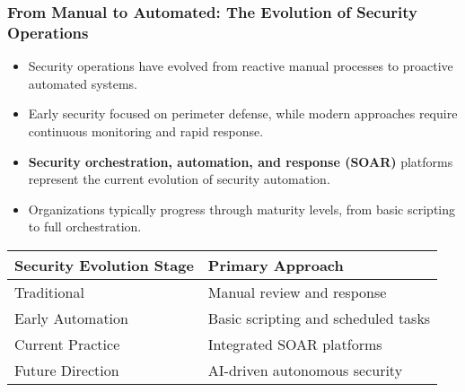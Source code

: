 \documentclass{beamer}
\begin{document}
\begin{frame}
  \frametitle{From Manual to Automated: The Evolution of Security Operations}
  
  \begin{itemize}
    \item Security operations have evolved from reactive manual processes to proactive automated systems.
    \item Early security focused on perimeter defense, while modern approaches require continuous monitoring and rapid response.
    \item \textbf{Security orchestration, automation, and response (SOAR)} platforms represent the current evolution of security automation.
    \item Organizations typically progress through maturity levels, from basic scripting to full orchestration.
  \end{itemize}
  
  \begin{table}
    \begin{tabular}{|l|l|}
      \hline
      \textbf{Security Evolution Stage} & \textbf{Primary Approach} \\
      \hline
      Traditional & Manual review and response \\
      Early Automation & Basic scripting and scheduled tasks \\
      Current Practice & Integrated SOAR platforms \\
      Future Direction & AI-driven autonomous security \\
      \hline
    \end{tabular}
  \end{table}
\end{frame}
\end{document}
